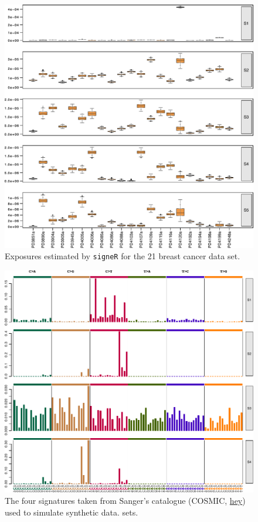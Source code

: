 \documentclass[11pt]{amsart}
\theoremstyle{definition}
\begin{document}
\begin{center}
\begin{figure}
  \includegraphics[width=16cm]
     {sfigs/Exposure_boxplot_simulated_21bc_com_Opp}
  \caption{Exposures estimated by \texttt{signeR} for the  21 breast
     cancer data set.}\label{fig:21BCExposures}
\end{figure}
\end{center}

\begin{center}
\begin{figure}
  \includegraphics[width=16cm]{sfigs/Signature_standard_Cosmic_plot}
  \caption{The four signatures taken from Sanger's catalogue (COSMIC,
    \url{hey}) used to simulate synthetic data.
    sets.}\label{fig:COSMIC}
\end{figure}
\end{center}
\end{document}
